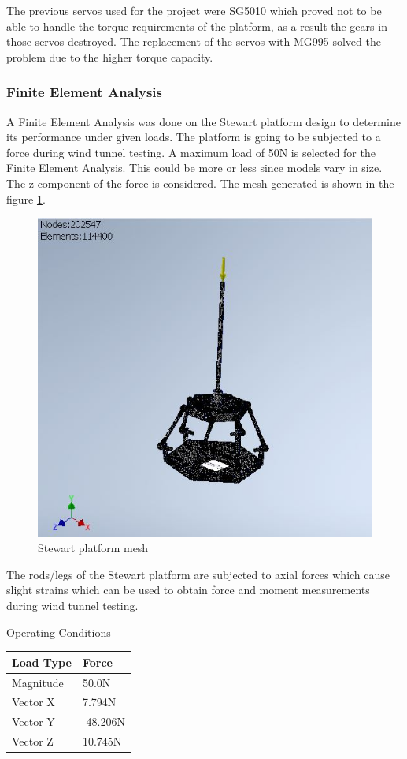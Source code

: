 The previous servos used for the project were SG5010 which proved not to be able to handle the torque requirements of the platform, 
as a result the gears in those servos destroyed. The replacement of the servos with MG995 solved the problem due to the higher torque capacity.

\subsubsection{Finite Element Analysis}
A Finite Element Analysis was done on the Stewart platform design to determine its performance under given loads. The platform is going to be subjected to a force during wind tunnel testing. A maximum load of 50N is selected for the Finite Element Analysis. This could be more or less since models vary in size. The z-component of the force is considered. 
The mesh generated is shown in the figure \ref{fig:feamesh}.
\begin{center}
	\begin{figure}[H]
	\centering
	\includegraphics[width=0.75\linewidth]{Figures/FEA}
	\caption[Stewart platform mesh]{Stewart platform mesh}
	\label{fig:feamesh}
	\end{figure}
\end{center}
The rods/legs of the Stewart platform are subjected to axial forces which cause slight strains which can be used to obtain force and moment measurements during wind tunnel testing.
\clearpage
\begin{center}
\begin{table}[H]
\caption{Operating Conditions}
\centering
\end{table}
\begin{tabular}{|l|l|}
\hline
\textbf{Load Type} & \textbf{Force}\\
\hline
Magnitude & 50.0N\\
\hline
Vector X & 7.794N\\
\hline
Vector Y & -48.206N\\
\hline
Vector Z & 10.745N\\
\hline
\end{tabular}
\end{center}

